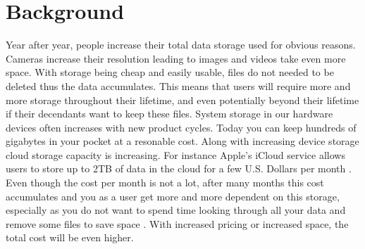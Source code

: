 \section{Background}
\label{sec:background}


Year after year, people increase their total data storage used for obvious reasons. Cameras increase their resolution leading to images and videos take even more space. With storage being cheap and easily usable, files do not needed to be deleted thus the data accumulates. %
This means that users will require more and more storage throughout their lifetime, and even potentially beyond their lifetime if their decendants want to keep these files. System storage in our hardware devices often increases with new product cycles. Today you can keep hundreds of gigabytes in your pocket at a resonable cost.%
Along with increasing device storage cloud storage capacity is increasing. For instance Apple's iCloud service allows users to store up to 2TB of data in the cloud for a few U.S. Dollars per month %
. Even though the cost per month is not a lot, after many months this cost accumulates and you as a user get more and more dependent on this storage, especially as you do not want to spend time looking through all your data and remove some files to save space %
. With increased pricing or increased space, the total cost will be even higher.

